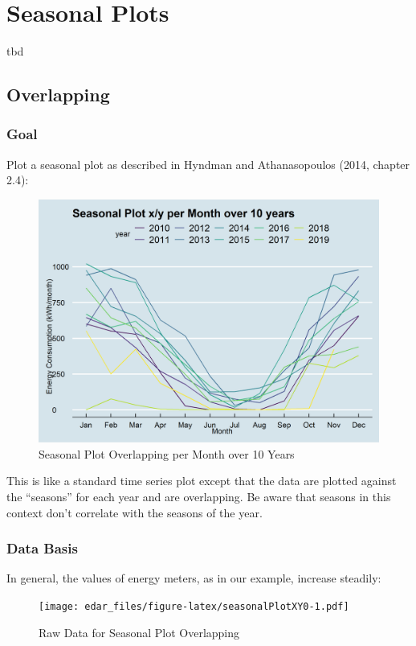 \documentclass[
]{book}
\begin{document}
\hypertarget{seasonal-plots}{%
\chapter{Seasonal Plots}\label{seasonal-plots}}

tbd

\hypertarget{overlapping}{%
\section{Overlapping}\label{overlapping}}

\hypertarget{goal}{%
\subsection{Goal}\label{goal}}

Plot a seasonal plot as described in Hyndman and Athanasopoulos (2014, chapter 2.4):

\begin{figure}
\includegraphics[width=0.7\linewidth]{images/plotSeasonalXY} \caption{Seasonal Plot Overlapping per Month over 10 Years}\label{fig:unnamed-chunk-4}
\end{figure}

This is like a standard time series plot except that the data are plotted against the ``seasons'' for each year and are overlapping. Be aware that seasons in this context don't correlate with the seasons of the year.

\hypertarget{data-basis}{%
\subsection{Data Basis}\label{data-basis}}

In general, the values of energy meters, as in our example, increase steadily:

\begin{figure}
\centering
\texttt{[image: edar\_files/figure-latex/seasonalPlotXY0-1.pdf]}
\caption{\label{fig:seasonalPlotXY0}Raw Data for Seasonal Plot Overlapping}
\end{figure}
\end{document}
